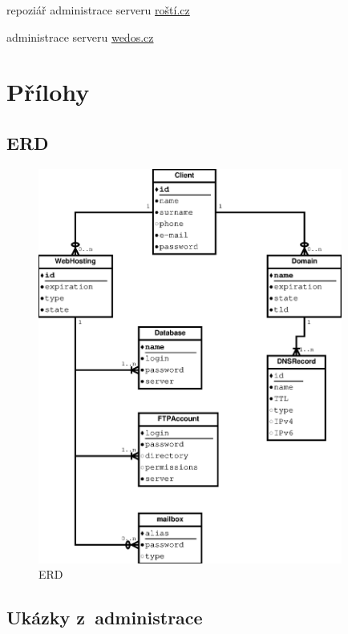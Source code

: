 \documentclass[11pt,a4paper]{article}
\begin{document}
    \begin{enumerate}[label={[\arabic*]}]
      \item repoziář administrace serveru \href{https://github.com/creckx/pcp}
                                               {roští.cz}
      \item administrace serveru \href{https://wedos.cz}{wedos.cz}
    \end{enumerate}

  \appendix
  \newpage

  \section{Přílohy}

    \subsection{ERD}

      \begin{figure}[ht]
        \begin{center}
          \includegraphics[width=10cm]{erd}
          \caption{ERD}
        \end{center}
      \end{figure}

    \subsection{Ukázky z~administrace}
\end{document}

